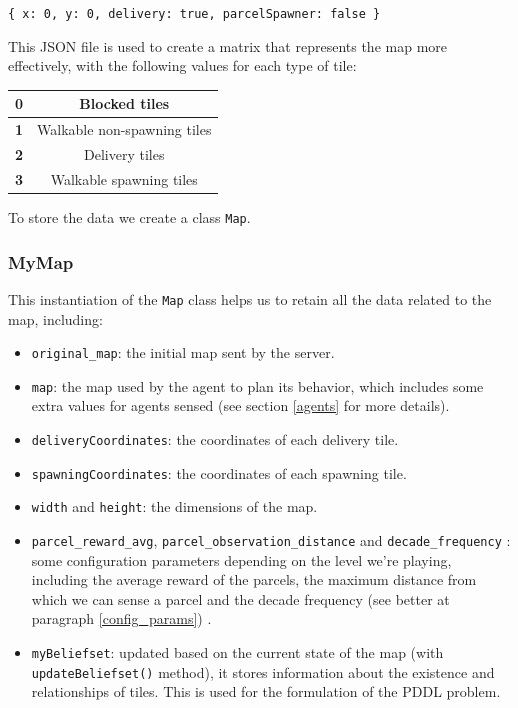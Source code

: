 \documentclass[12pt]{article}
\begin{document}
\begin{center}
    \texttt{\{ x: 0, y: 0, delivery: true, parcelSpawner: false \}}
\end{center}

This JSON file is used to create a matrix that represents the map more effectively, with the following values for each type of tile:

\begin{table}[h]
    \centering
    \begin{tabular}{|c|c|}
        \hline
        \textbf{0} & Blocked tiles \\
        \hline
        \textbf{1} & Walkable non-spawning tiles \\
        \hline
        \textbf{2} & Delivery tiles \\
        \hline
        \textbf{3} & Walkable spawning tiles \\
        \hline
    \end{tabular}
    \label{tab}
\end{table}

To store the data we create a class \texttt{Map}.

\subsubsection{MyMap}
This instantiation of the \texttt{Map} class helps us to retain all the data related to the map, including:

\begin{itemize}
    \item \texttt{original\_map}: the initial map sent by the server.
    \item \texttt{map}: the map used by the agent to plan its behavior, which includes some extra values for agents sensed (see section \ref{agents} for more details).
    \item \texttt{deliveryCoordinates}: the coordinates of each delivery tile.
    \item \texttt{spawningCoordinates}: the coordinates of each spawning tile.
    \item \texttt{width} and \texttt{height}: the dimensions of the map.
    \item \texttt{parcel\_reward\_avg}, \texttt{parcel\_observation\_distance} and \texttt{decade\_frequency} : some configuration parameters depending on the level we're playing, including the average reward of the parcels, the maximum distance from which we can sense a parcel and the decade frequency (see better at paragraph \ref{config_params}) .
    \item \texttt{myBeliefset}: updated based on the current state of the map (with \texttt{updateBeliefset()} method), it stores information about the existence and relationships of tiles. This is used for the formulation of the PDDL problem.
\end{itemize}
\end{document}
